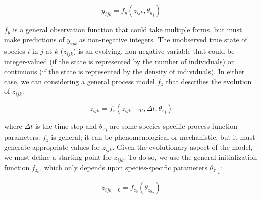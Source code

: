 \documentclass{article}
\begin{document}
\begin{equation}
y_{ijk} = f_y(z_{ijk}, {\theta_{y}}_i)
\end{equation}

$f_y$ is a general observation function that could take multiple forms, but must make predictions of $y_{ijk}$ as non-negative integers. The unobserved true state of species $i$ in $j$ at $k$ ($z_{ijk}$) is an evolving, non-negative variable that could be integer-valued (if the state is represented by the number of individuals) or continuous (if the state is represented by the density of individuals). In either case, we can considering a general process model $f_z$ that describes the evolution of $z_{ijk}$:

\begin{equation}
z_{ijk} = f_z({z_{ijk - \Delta t}}, \Delta t, {{\theta_z}}_i)
\end{equation}

where $\Delta t$ is the time step and ${\theta_{z}}_i$ are some species-specific process-function parameters. $f_z$ is general; it can be phenomenological or mechanistic, but it must generate appropriate values for $z_{ijk}$. Given the evolutionary aspect of the model, we must define a starting point for $z_{ijk}$. To do so, we use the general initialization function $f_{z_0}$, which only depends upon species-specific parameters ${\theta_{z_0}}_i$:

\begin{equation}
z_{ijk = 0} = f_{z_0}({\theta_{z_0}}_i)
\end{equation}


  
\end{document}
